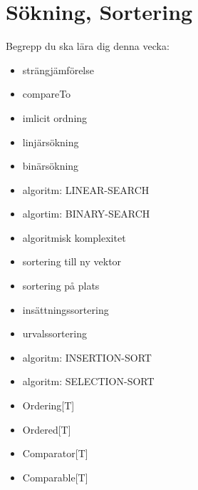 \chapter{Sökning, Sortering}\label{chapter:W10}
Begrepp du ska lära dig denna vecka:
\begin{itemize}[noitemsep,label={$\square$},leftmargin=*]
\item strängjämförelse
\item compareTo
\item imlicit ordning
\item linjärsökning
\item binärsökning
\item algoritm: LINEAR-SEARCH
\item algortim: BINARY-SEARCH
\item algoritmisk komplexitet
\item sortering till ny vektor
\item sortering på plats
\item insättningssortering
\item urvalssortering
\item algoritm: INSERTION-SORT
\item algoritm: SELECTION-SORT
\item Ordering[T]
\item Ordered[T]
\item Comparator[T]
\item Comparable[T]\end{itemize}
